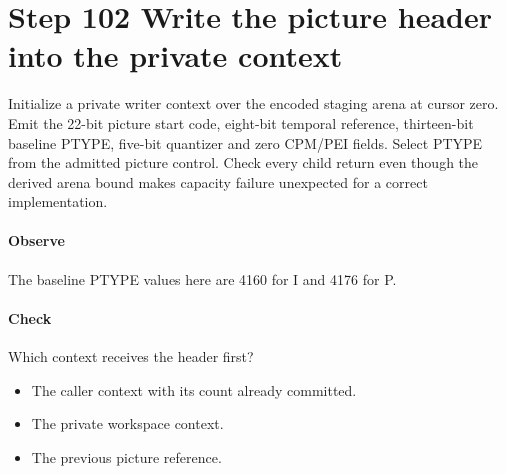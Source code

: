 \section{Step 102 Write the picture header into the private context}\label{h263-picture-s02}
Initialize a private writer context over the encoded staging arena at cursor zero.
Emit the 22-bit picture start code, eight-bit temporal reference, thirteen-bit
baseline PTYPE, five-bit quantizer and zero CPM/PEI fields. Select PTYPE from the
admitted picture control. Check every child return even though the derived arena
bound makes capacity failure unexpected for a correct implementation.

\paragraph{Observe} The baseline PTYPE values here are 4160 for I and 4176 for P.
\paragraph{Check} Which context receives the header first?
\begin{itemize}
  \item[A.] The caller context with its count already committed.
  \item[B.] The private workspace context.
  \item[C.] The previous picture reference.
\end{itemize}
